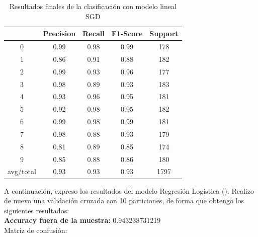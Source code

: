 \begin{table}[H]
	\centering
	\begin{tabular}{|c|c|c|c|c|}
		\hline
		& Precision & Recall & F1-Score & Support \\ \hline
		0         & 0.99      & 0.98   & 0.99     & 178     \\ \hline
		1         & 0.86      & 0.91   & 0.88     & 182     \\ \hline
		2         & 0.99      & 0.93   & 0.96     & 177     \\ \hline
		3         & 0.98      & 0.89   & 0.93     & 183     \\ \hline
		4         & 0.93      & 0.96   & 0.95     & 181     \\ \hline
		5         & 0.92      & 0.98   & 0.95     & 182     \\ \hline
		6         & 0.99      & 0.98   & 0.99     & 181     \\ \hline
		7         & 0.98      & 0.88   & 0.93     & 179     \\ \hline
		8         & 0.81      & 0.89   & 0.85     & 174     \\ \hline
		9         & 0.85      & 0.88   & 0.86     & 180     \\ \hline
		avg/total & 0.93      & 0.93   & 0.93     & 1797    \\ \hline
	\end{tabular}
	\caption{Resultados finales de la clasificación con modelo lineal SGD}
\end{table}



A continuación, expreso los resultados del modelo Regresión Logística (\cite{lr}). Realizo de nuevo una validación cruzada con 10 particiones, de forma que obtengo los siguientes resultados: \\

\textbf{Accuracy fuera de la muestra:} 0.943238731219 \\

Matriz de confusión:

